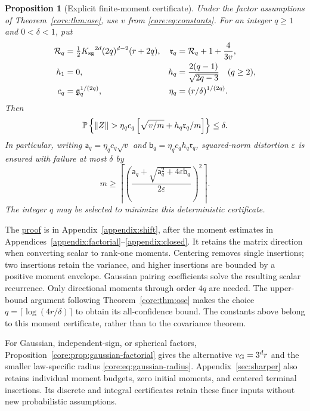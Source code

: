 \documentclass[11pt,a4paper]{article}
\newtheorem{proposition}[theorem]{Proposition}
\theoremstyle{definition}\newtheorem{definition}[theorem]{Definition}
\theoremstyle{remark}\newtheorem{remark}[theorem]{Remark}
\numberwithin{equation}{section}
\newcommand{\Ksg}{{K_{\mathrm{sg}}}}\newcommand{\Cfour}{{C_4}}
\newcommand{\gmom}{\mathfrak g}
\newcommand{\Rmom}{\mathfrak r}
\newcommand{\norm}[1]{\lVert#1\rVert}\newcommand{\ip}[2]{\langle#1,#2\rangle}
\begin{document}
\begin{proposition}[Explicit finite-moment certificate]\label{core:prop:certificate}
Under the factor assumptions of Theorem~\ref{core:thm:ose}, use $v$ from
\eqref{core:eq:constants}. For an integer $q\ge1$ and $0<\delta<1$, put
\begin{align}\label{core:eq:scales}
 \mathcal R_q&=\tfrac12\Ksg^{2d}(2q)^{d-2}(r+2q),&
 \Rmom_q&=\mathcal R_q+1+\frac4{3v},\\
 h_1&=0,&h_q&=\frac{2(q-1)}{\sqrt{2q-3}}\quad(q\ge2),\notag\\
 c_q&=\gmom_q^{1/(2q)},&
 \eta_q&=(r/\delta)^{1/(2q)}.\label{core:eq:probability-factors}
\end{align}
Then
\begin{equation}\label{core:eq:explicit-closed}
 \Pp\left\{\norm Z>
 \eta_qc_q\left[\sqrt{v/m}+h_q\Rmom_q/m\right]\right\}\le\delta.
\end{equation}
In particular, writing $\mathsf a_q=\eta_qc_q\sqrt v$ and
$\mathsf b_q=\eta_qc_qh_q\Rmom_q$, squared-norm distortion
$\varepsilon$ is ensured with failure at most $\delta$ by
\begin{equation}\label{core:eq:explicit-m}
 m\ge\left\lceil
 \left(\frac{\mathsf a_q+
 \sqrt{\mathsf a_q^2+4\varepsilon\mathsf b_q}}{2\varepsilon}\right)^2
 \right\rceil.
\end{equation}
The integer $q$ may be selected to minimize this deterministic certificate.
\end{proposition}

The \hyperref[proof:certificate]{proof} is in
Appendix~\ref{appendix:shift}, after the moment estimates in
Appendices~\ref{appendix:factorial}--\ref{appendix:closed}.
It retains the matrix direction when converting scalar to rank-one moments.
Centering removes single insertions; two insertions retain the variance,
and higher insertions are bounded by a positive moment envelope.
Gaussian pairing coefficients solve the resulting scalar recurrence.
Only directional moments through order $4q$ are needed.
The upper-bound argument following Theorem~\ref{core:thm:ose} makes the choice
$q=\lceil\log(4r/\delta)\rceil$ to obtain its all-confidence bound.
The constants above belong to this moment certificate, rather than
to the covariance theorem.

For Gaussian, independent-sign, or spherical factors,
Proposition~\ref{core:prop:gaussian-factorial} gives the alternative
$v_{\rm G}=3^dr$ and the smaller law-specific radius
\eqref{core:eq:gaussian-radius}. Appendix~\ref{sec:sharper} also retains
individual moment budgets, zero initial moments, and centered terminal
insertions. Its discrete and integral certificates retain these finer inputs
without new probabilistic assumptions.
\end{document}
